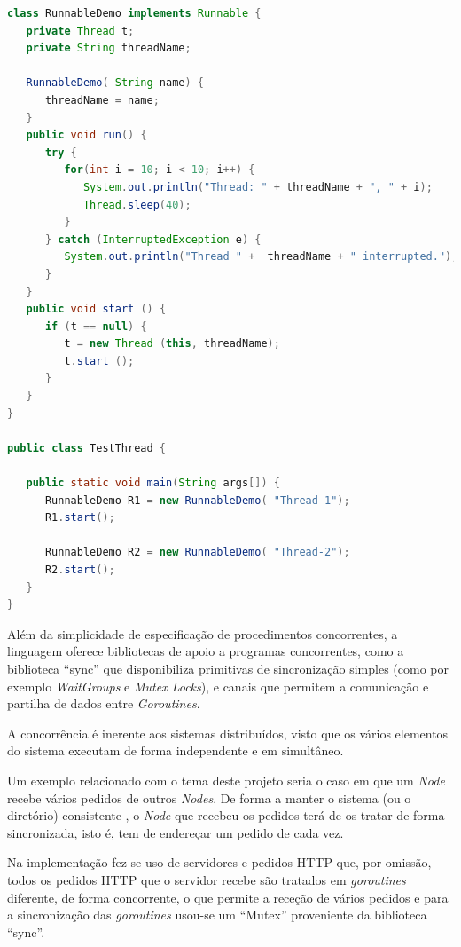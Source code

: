 
\begin{lstlisting}[caption={Exemplo em \emph{Java}, usando a \emph{interface} ``Runnable'' e uma classe``RunnableDemo'' para começar \emph{threads}.},language=Java]
class RunnableDemo implements Runnable {
   private Thread t;
   private String threadName;
   
   RunnableDemo( String name) {
      threadName = name;
   }
   public void run() {
      try {
         for(int i = 10; i < 10; i++) {
            System.out.println("Thread: " + threadName + ", " + i);
            Thread.sleep(40);
         }
      } catch (InterruptedException e) {
         System.out.println("Thread " +  threadName + " interrupted.");
      }
   }
   public void start () {
      if (t == null) {
         t = new Thread (this, threadName);
         t.start ();
      }
   }
}

public class TestThread {

   public static void main(String args[]) {
      RunnableDemo R1 = new RunnableDemo( "Thread-1");
      R1.start();
      
      RunnableDemo R2 = new RunnableDemo( "Thread-2");
      R2.start();
   }   
}

\end{lstlisting}

Além da simplicidade de especificação de procedimentos concorrentes, a linguagem oferece bibliotecas de apoio a programas concorrentes, como a biblioteca ``sync'' que disponibiliza primitivas de sincronização simples (como por exemplo \emph{WaitGroups} e \emph{Mutex Locks}), e canais que permitem a comunicação e partilha de dados entre \emph{Goroutines}.

A concorrência é inerente aos sistemas distribuídos, visto que os vários elementos do sistema executam de forma independente e em simultâneo.

Um exemplo relacionado com o tema deste projeto seria o caso em que um \emph{Node} recebe vários pedidos de outros \emph{Nodes}. De forma a manter o sistema (ou o diretório) consistente , o \emph{Node} que recebeu os pedidos terá de os tratar de forma sincronizada, isto é, tem de endereçar um pedido de cada vez.

Na implementação fez-se uso de servidores e pedidos \acs{HTTP} que, por omissão, todos os pedidos \acs{HTTP} que o servidor recebe são tratados em \emph{goroutines} diferente, de forma concorrente, o que permite a receção de vários pedidos e para a sincronização das \emph{goroutines} usou-se um ``Mutex'' proveniente da biblioteca ``sync''.



